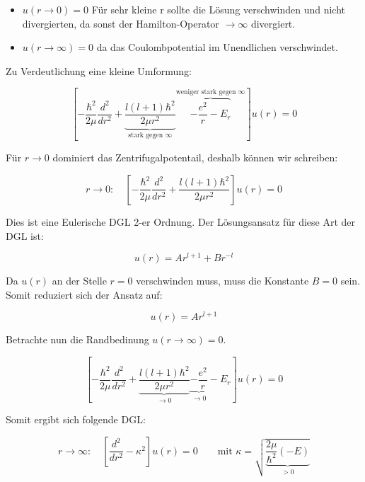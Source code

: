 \begin{itemize}
\item \(u(r \to 0)=0  \) Für sehr kleine r sollte die Lösung verschwinden und nicht divergierten, da sonst der Hamilton-Operator \(\to\infty\) divergiert.
\item  \(u(r \to \infty)=0  \) da das Coulombpotential im Unendlichen verschwindet.
\end{itemize}

Zu Verdeutlichung eine kleine Umformung:

\begin{equation}
  \label{eq:22}
   \left[-\frac{\hbar^2}{2\mu}\frac{d^2}{dr^2} + \underbrace{\frac{l(l+1)\hbar^2}{2\mu r^2}}_{\text{stark gegen }\infty}  \overbrace{- \frac{e^2}{r} - E_r}^{\text{weniger stark gegen }\infty}   \right] u(r)   = 0 
\end{equation}

Für \(r\to 0\) dominiert das Zentrifugalpotentail, deshalb können wir schreiben:

\begin{equation}
  \label{eq:21}
  r\to 0: \quad\left[-\frac{\hbar^2}{2\mu}\frac{d^2}{dr^2}+ \frac{l(l+1)\hbar^2}{2\mu r^2}\right] u(r) = 0
\end{equation}

Dies ist eine Eulerische DGL 2-er Ordnung. Der Lösungsansatz für diese Art der DGL ist:

\begin{equation}
  \label{eq:23}
  u(r) = Ar^{l+1}+Br^{-l}
\end{equation}

Da \(u(r)\) an der Stelle \(r=0\) verschwinden muss, muss die Konstante \(B=0\) sein. Somit reduziert sich der Ansatz auf:

\begin{equation}
  \label{eq:24}
  u(r) = Ar^{l+1}
\end{equation}

Betrachte nun die Randbedinung \(u(r\to \infty) = 0\).

\begin{equation}
  \label{eq:25}
  \left[-\frac{\hbar^2}{2\mu}\frac{d^2}{dr^2} + \underbrace{\frac{l(l+1)\hbar^2}{2\mu r^2}}_{\to 0}  \underbrace{- \frac{e^2}{r} }_{\to 0} - E_r  \right] u(r)   = 0 
\end{equation}

Somit ergibt sich folgende DGL:

\begin{equation}
  \label{eq:26}
  r\to \infty: \quad\left[\frac{d^2}{dr^2} - \kappa^2\right]u(r) = 0 \qquad \text{mit }\kappa = \sqrt{\underbrace{\frac{2\mu}{\hbar^2}(-E)}_{>0}}
\end{equation}

